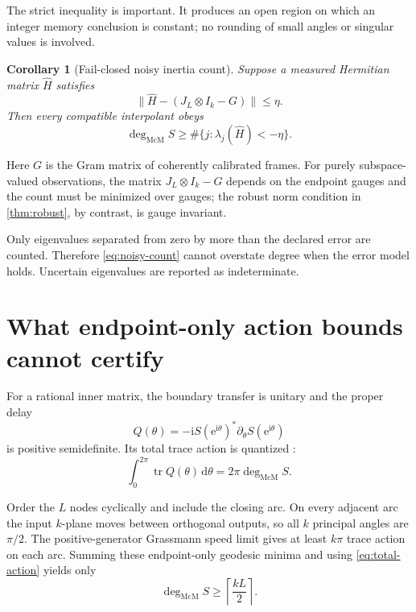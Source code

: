 \documentclass[11pt]{article}
\newtheorem{corollary}[theorem]{Corollary}
\theoremstyle{definition}
\theoremstyle{remark}
\newcommand{\tr}{\operatorname{tr}}
\newcommand{\dd}{\mathrm d}
\newcommand{\e}{\mathrm e}
\newcommand{\mcdeg}{\deg_{\mathrm{McM}}}
\newcommand{\norm}[1]{\lVert#1\rVert}
\begin{document}
The strict inequality is important.  It produces an open region on which an
integer memory conclusion is constant; no rounding of small angles or
singular values is involved.

\begin{corollary}[Fail-closed noisy inertia count]
\label{cor:noisy}
Suppose a measured Hermitian matrix $\widehat H$ satisfies
\[
 \norm{\widehat H-(J_L\otimes I_k-G)}\le\eta.
\]
Then every compatible interpolant obeys
\begin{equation}\label{eq:noisy-count}
 \mcdeg S\ge
 \#\{j:\lambda_j(\widehat H)<-\eta\}.
\end{equation}
\end{corollary}

Here $G$ is the Gram matrix of coherently calibrated frames.  For purely
subspace-valued observations, the matrix $J_L\otimes I_k-G$ depends on the
endpoint gauges and the count must be minimized over gauges; the robust norm
condition in \cref{thm:robust}, by contrast, is gauge invariant.

Only eigenvalues separated from zero by more than the declared error are
counted.  Therefore \eqref{eq:noisy-count} cannot overstate degree when the
error model holds.  Uncertain eigenvalues are reported as indeterminate.

\section{What endpoint-only action bounds cannot certify}

For a rational inner matrix, the boundary transfer is unitary and the proper
delay
\begin{equation}\label{eq:proper-delay}
 Q(\theta)=-\mathrm iS(\e^{\mathrm i\theta})^*
               \partial_\theta S(\e^{\mathrm i\theta})
\end{equation}
is positive semidefinite.  Its total trace action is quantized
\cite{Wigner1955,Smith1960,Potapov1955}:
\begin{equation}\label{eq:total-action}
             \int_0^{2\pi}\tr Q(\theta)\,\dd\theta=2\pi\mcdeg S.
\end{equation}

Order the $L$ nodes cyclically and include the closing arc.  On every adjacent
arc the input $k$-plane moves between orthogonal outputs, so all $k$
principal angles are $\pi/2$.  The positive-generator Grassmann speed limit
\cite{QiuZhangLi2005,AntezanaLarotondaVarela2014,
ErikssonDelayRegions2026} gives at least $k\pi$ trace action on each arc.
Summing these endpoint-only geodesic minima and using
\eqref{eq:total-action} yields only
\begin{equation}\label{eq:local-action-bound}
                     \mcdeg S\ge\left\lceil\frac{kL}{2}\right\rceil.
\end{equation}
\end{document}
